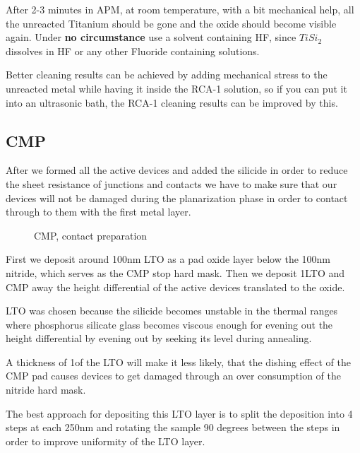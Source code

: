 After 2-3 minutes in APM, at room temperature, with a bit mechanical help, all the unreacted Titanium should be gone and the oxide should become visible again.
Under \textbf{no circumstance} use a solvent containing HF, since $Ti Si_2$ dissolves in HF or any other Fluoride containing solutions.

Better cleaning results can be achieved by adding mechanical stress to the unreacted metal while having it inside the RCA-1 solution,
so if you can put it into an ultrasonic bath, the RCA-1 cleaning results can be improved by this.

\newpage

\subsection{CMP}\label{chapter_silicide_and_cmp}

After we formed all the active devices and added the silicide in order to reduce the sheet resistance of junctions and contacts we have to make sure that
our devices will not be damaged during the planarization phase in order to contact through to them with the first metal layer.

\begin{figure}[H]
	\centering
	\begin{tikzpicture}[node distance = 3cm, auto, thick,scale=\CrossSectionOnly, every node/.style={transform shape}]
		
	\end{tikzpicture}
	\begin{tikzpicture}[node distance = 3cm, auto, thick,scale=\CrossSectionOnly, every node/.style={transform shape}]
		
	\end{tikzpicture}
	\caption{CMP, contact preparation}
\end{figure}

First we deposit around 100nm LTO as a pad oxide layer below the 100nm nitride, which serves as the CMP stop hard mask.
Then we deposit 1\um LTO and CMP away the height differential of the active devices translated to the oxide.

LTO was chosen because the silicide becomes unstable in the thermal ranges where phosphorus silicate glass becomes viscous enough
for evening out the height differential by evening out by seeking its level during annealing.

A thickness of 1\um of the LTO will make it less likely, that the dishing effect of the CMP pad causes devices to get damaged
through an over consumption of the nitride hard mask.

The best approach for depositing this LTO layer is to split the deposition into 4 steps at each 250nm and rotating the sample
90 degrees between the steps in order to improve uniformity of the LTO layer.

